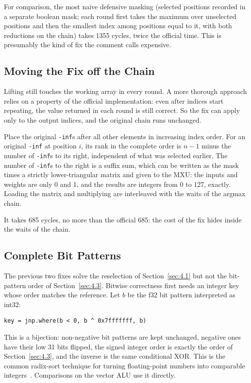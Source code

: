 \documentclass[sigconf,nonacm,balance=false]{acmart}
\newcommand{\code}[1]{\texttt{#1}}
\begin{document}
For comparison, the most naive defensive masking (selected positions recorded in a separate boolean mask; each round first takes the maximum over unselected positions and then the smallest index among positions equal to it, with both reductions on the chain) takes 1355 cycles, twice the official time. This is presumably the kind of fix the comment calls expensive.

\subsection{Moving the Fix off the Chain}
\label{sec:4.8}

Lifting still touches the working array in every round. A more thorough approach relies on a property of the official implementation: even after indices start repeating, the value returned in each round is still correct. So the fix can apply only to the output indices, and the original chain runs unchanged.

Place the original \code{-inf}s after all other elements in increasing index order. For an original \code{-inf} at position $i$, its rank in the complete order is $n - 1$ minus the number of \code{-inf}s to its right, independent of what was selected earlier. The number of \code{-inf}s to the right is a suffix sum, which can be written as the mask times a strictly lower-triangular matrix and given to the MXU: the inputs and weights are only 0 and 1, and the results are integers from 0 to 127, exactly. Loading the matrix and multiplying are interleaved with the waits of the argmax chain.

It takes 685 cycles, no more than the official 685: the cost of the fix hides inside the waits of the chain.

\subsection{Complete Bit Patterns}
\label{sec:4.9}

The previous two fixes solve the reselection of Section~\ref{sec:4.1} but not the bit-pattern order of Section~\ref{sec:4.3}. Bitwise correctness first needs an integer key whose order matches the reference. Let $b$ be the f32 bit pattern interpreted as int32:

\begin{lstlisting}
key = jnp.where(b < 0, b ^ 0x7fffffff, b)
\end{lstlisting}
This is a bijection: non-negative bit patterns are kept unchanged, negative ones have their low 31 bits flipped, the signed integer order is exactly the order of Section~\ref{sec:4.3}, and the inverse is the same conditional XOR. This is the common radix-sort technique for turning floating-point numbers into comparable integers~\cite{herf2001radix}. Comparisons on the vector ALU use it directly.
\end{document}
